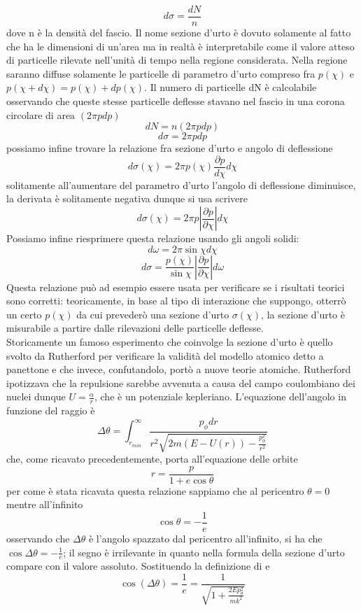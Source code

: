 \documentclass[
10pt, %
a4paper, %
oneside, %
headinclude,footinclude, %
BCOR5mm, %
]{scrartcl}
\begin{document}
\[d\sigma = \frac{dN}{n}\]
dove n è la densità del fascio. Il nome sezione d'urto è dovuto solamente al fatto che ha le dimensioni di un'area ma in realtà è interpretabile come il valore atteso di particelle rilevate nell'unità di tempo nella regione considerata. Nella regione saranno diffuse solamente le particelle di parametro d'urto compreso fra \(p(\chi)\) e \(p(\chi+d\chi) = p(\chi)+dp(\chi)\). Il numero di particelle dN è calcolabile osservando che queste stesse particelle deflesse stavano nel fascio in una corona circolare di area \((2\pi pdp)\)
\[dN = n(2\pi pdp)\]
\[d\sigma = 2\pi pdp\]
possiamo infine trovare la relazione fra sezione d'urto e angolo di deflessione 
\[d\sigma(\chi) = 2\pi p(\chi)\frac{\partial p}{d\chi}d\chi\]
solitamente all'aumentare del parametro d'urto l'angolo di deflessione diminuisce, la derivata è solitamente negativa dunque si usa scrivere
\[d\sigma(\chi) = 2\pi p|\frac{\partial p}{\partial\chi}|d\chi\]
Possiamo infine riesprimere questa relazione usando gli angoli solidi:
\[d\omega = 2\pi\sin\chi d\chi\]
\[d\sigma = \frac{p(\chi)}{\sin\chi}|\frac{\partial p}{\partial \chi}|d\omega \]
Questa relazione può ad esempio essere usata per verificare se i risultati teorici sono corretti: teoricamente, in base al tipo di interazione che suppongo, otterrò un certo \(p(\chi)\) da cui prevederò una sezione d'urto \(\sigma (\chi)\), la sezione d'urto è misurabile a partire dalle rilevazioni delle particelle deflesse.\\
Storicamente un famoso esperimento che coinvolge la sezione d'urto è quello svolto da Rutherford per verificare la validità del modello atomico detto a panettone e che invece, confutandolo, portò a nuove teorie atomiche. Rutherford ipotizzava che la repulsione sarebbe avvenuta a causa del campo coulombiano dei nuclei dunque \(U=\frac{\alpha}{r}\), che è un potenziale kepleriano. L'equazione dell'angolo in funzione del raggio è
\[\Delta\theta=\int_{r_{min}}^{\infty}\frac{p_{\phi}dr}{r^2\sqrt{2m(E-U(r))-\frac{p_\phi^2}{r^2}}}\]
che, come ricavato precedentemente, porta all'equazione delle orbite 
\[r=\frac{p}{1+e\cos\theta}\]
per come è stata ricavata questa relazione sappiamo che al pericentro \(\theta = 0\) mentre all'infinito
\[\cos\theta = -\frac{1}{e}\]
osservando che \(\Delta\theta\) è l'angolo spazzato dal pericentro all'infinito, si ha che \(\cos\Delta\theta = -\frac{1}{e}\);
il segno è irrilevante in quanto nella formula della sezione d'urto compare con il valore assoluto. Sostituendo la definizione di e
\[\cos(\Delta\theta) = \frac{1}{e} = \frac{1}{\sqrt{1+\frac{2Ep_\theta^2}{mk^2}}}\]
\end{document}
